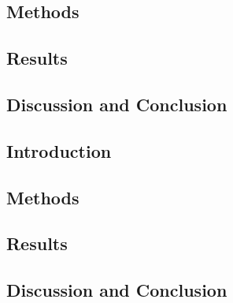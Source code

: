         \subsection{Methods} \label{extension_of_static_pca_based_data_driven_surrogate_signal_extraction_to_dynamic_pet_methods}
            \blindtext
            
        \subsection{Results} \label{extension_of_static_pca_based_data_driven_surrogate_signal_extraction_to_dynamic_pet_results}
            \blindtext
            
        \subsection{Discussion and Conclusion} \label{extension_of_static_pca_based_data_driven_surrogate_signal_extraction_to_dynamic_pet_discussion_and_conclusion}
            \blindtext
    
        \blindtext
        
        \subsection{Introduction} \label{feasibility_of_neural_network_based_data_driven_surrogate_signal_extraction_methods_for_dynamic_pet_introduction}
        
        \subsection{Methods} \label{feasibility_of_neural_network_based_data_driven_surrogate_signal_extraction_methods_for_dynamic_pet_methods}
            \blindtext
            
        \subsection{Results} \label{feasibility_of_neural_network_based_data_driven_surrogate_signal_extraction_methods_for_dynamic_pet_results}
            \blindtext
            
        \subsection{Discussion and Conclusion} \label{feasibility_of_neural_network_based_data_driven_surrogate_signal_extraction_methods_for_dynamic_pet_discussion_and_conclusion}
            \blindtext
